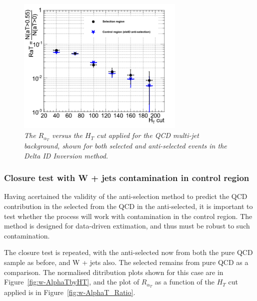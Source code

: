 \begin{figure}[h!]
\begin{center}
\includegraphics[width=80mm]{Plots/mc-alphaTratio}
\end{center}
\caption{\textit{The $R_{\alpha_T}$ versus the $H_{T}$ cut applied for the QCD multi-jet background, shown for both selected and anti-selected events in the Delta ID Inversion method.}}
\label{fig:AlphaT_Ratio}
\end{figure}

\subsubsection {Closure test with W + jets contamination in control region}

Having acertained the validity of the anti-selection method to predict the QCD contribution in the selected from the QCD in the anti-selected, it is important to test whether the process will work with contamination in the control region. The method is designed for data-driven extimation, and thus must be robust to such contamination.

The closure test is repeated, with the anti-selected now from both the pure QCD sample as before, and W + jets also. The selected remains from pure QCD as a comparison. The normalised ditribution plots shown for this case are in Figure~\ref{fig:w-AlphaTbyHT}, and the plot of $R_{\alpha_T}$ as a function of the $H_{T}$ cut applied is in Figure~\ref{fig:w-AlphaT_Ratio}. 

